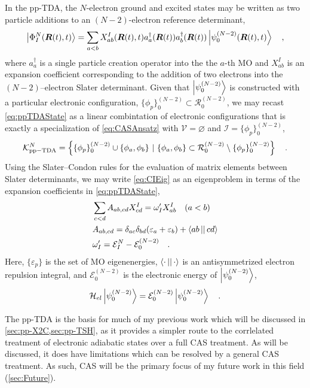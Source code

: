 In the pp-TDA, the $N$-electron ground and excited states may be written as two
particle additions to an $(N-2)$-electron reference determinant,
\begin{equation}
\left\vert \Phi_I^N (\boldsymbol{R}(t),t) \right\rangle = \sum_{a < b} X_{ab}^I(\boldsymbol{R}(t),t)
a_a^\dagger(\boldsymbol{R}(t)) a_b^\dagger (\boldsymbol{R}(t))
\left\vert \psi_0^{(N-2)}(\boldsymbol{R}(t),t) \right\rangle \quad, \label{eq:ppTDAState}
\end{equation}
where $a_a^\dagger$ is a single particle creation operator into the the $a$-th
MO and $X_{ab}^I$ is an expansion coefficient corresponding to the addition of
two electrons into the $(N-2)$--electron Slater determinant. Given that
$\left\vert \psi_0^{(N-2)} \right\rangle$ is constructed with a particular electronic
configuration, $\{ \phi_p \}^{(N-2)}_0 \subset \mathcal{R}^{(N-2)}_0$, we may recast
\cref{eq:ppTDAState} as a linear combintation of electronic configurations that
is exactly a specialization of \cref{eq:CASAnsatz} with
$\mathcal{V} = \varnothing$ and $\mathcal{I} = \{ \phi_p \}^{(N-2)}_0$,
\begin{equation}
\mathcal{K}_\mathrm{pp-TDA}^N =
\left\lbrace \{ \phi_p \}^{(N-2)}_0 \cup \{\phi_a,\phi_b \} \text{ }\vert\text{ } 
\{ \phi_a,\phi_b \} \subset \mathcal{R}^{(N-2)}_0 \setminus \{\phi_p \}^{(N-2)}_0 
\right\rbrace \quad.
\end{equation}
Using the Slater--Condon rules for the evaluation of matrix elements between
Slater determinants\cite{Szabo}, we may write \cref{eq:CIEig} as an eigenproblem
in terms of the expansion coefficients in \cref{eq:ppTDAState},
\begin{align}
&\sum_{c < d} A_{ab,cd} X_{cd}^I = \omega'_I X_{ab}^I \quad (a < b)\\
&A_{ab,cd} = \delta_{ac}\delta_{bd}(\varepsilon_a + \varepsilon_b) + 
  \left\langle ab \left\vert  \right\vert cd \right\rangle \\
&\omega'_I = \mathcal{E}^{N}_I - \mathcal{E}^{(N-2)}_0
\quad.
\end{align}
Here, $\{\varepsilon_p\}$ is the set of MO eigenenergies,
$\left\langle \cdot \left\vert  \right\vert \cdot \right\rangle$ is an antisymmetrized electron repulsion integral,
and $\mathcal{E}_0^{(N-2)}$ is the electronic energy of $\left\vert \psi_0^{(N-2)} \right\rangle$,
\begin{equation}
\mathcal{H}_{el}\left\vert \psi_0^{(N-2)} \right\rangle = \mathcal{E}_0^{(N-2)}\left\vert \psi_0^{(N-2)} \right\rangle
\quad.
\end{equation}

The pp-TDA is the basis for much of my previous work which will be discussed in
\cref{sec:pp-X2C,sec:pp-TSH}, as it provides a simpler route to the corrlelated
treatment of electronic adiabatic states over a full CAS treatment. As will be
discussed, it does have limitations which can be resolved by a general CAS
treatment. As such, CAS will be the primary focus of my future work in this
field (\cref{sec:Future}).
